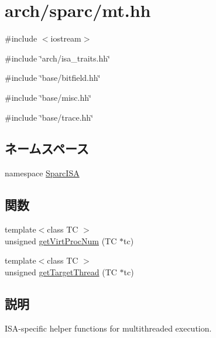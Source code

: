 \hypertarget{sparc_2mt_8hh}{
\section{arch/sparc/mt.hh}
\label{sparc_2mt_8hh}
}
{\ttfamily \#include $<$iostream$>$}\par
{\ttfamily \#include \char`\"{}arch/isa\_\-traits.hh\char`\"{}}\par
{\ttfamily \#include \char`\"{}base/bitfield.hh\char`\"{}}\par
{\ttfamily \#include \char`\"{}base/misc.hh\char`\"{}}\par
{\ttfamily \#include \char`\"{}base/trace.hh\char`\"{}}\par
\subsection*{ネームスペース}
\begin{DoxyCompactItemize}
\item 
namespace \hyperlink{namespaceSparcISA}{SparcISA}
\end{DoxyCompactItemize}
\subsection*{関数}
\begin{DoxyCompactItemize}
\item 
{\footnotesize template$<$class TC $>$ }\\unsigned \hyperlink{namespaceSparcISA_a94f35932feb0cb5ef4428bf4572343e3}{getVirtProcNum} (TC $\ast$tc)
\item 
{\footnotesize template$<$class TC $>$ }\\unsigned \hyperlink{namespaceSparcISA_a4ea507861bd4ae5fdd7f3e99f20f8333}{getTargetThread} (TC $\ast$tc)
\end{DoxyCompactItemize}


\subsection{説明}
ISA-\/specific helper functions for multithreaded execution. 